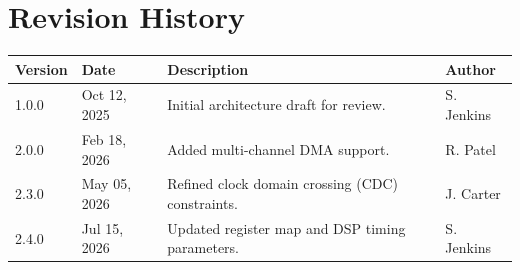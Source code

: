 \section*{Revision History}
\noindent
\begin{tabularx}{\textwidth}{l l X l}
\toprule
\textbf{Version} & \textbf{Date} & \textbf{Description} & \textbf{Author} \\
\midrule
1.0.0 & Oct 12, 2025 & Initial architecture draft for review. & S. Jenkins \\
2.0.0 & Feb 18, 2026 & Added multi-channel DMA support. & R. Patel \\
2.3.0 & May 05, 2026 & Refined clock domain crossing (CDC) constraints. & J. Carter \\
2.4.0 & Jul 15, 2026 & Updated register map and DSP timing parameters. & S. Jenkins \\
\bottomrule
\end{tabularx}
